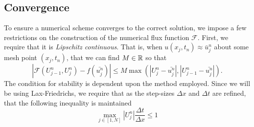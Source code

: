 \documentclass{myproject}
\begin{document}
\subsection{Convergence}
To ensure a numerical scheme converges to the correct solution, we impose a few restrictions on the construction of the numerical flux function $\mathcal{F}$. First, we require that it is \emph{Lipschitz continuous}. That is, when $u(x_j,t_n) \approx \bar{u}_j^n$ about some mesh point $(x_j,t_n)$, that we can find $M \in \operatorname{\mathbb{R}}$ so that
\begin{equation}
    \left| \mathcal{F}(U_{j-1}^n, U_j^n) - f(\bar{u_j^n}) \right| \leq M \max\left( \left| U_j^n - \bar{u^n_j} \right|, \left| U_{j-1}^n - \bar{u_j^n} \right| \right).
\end{equation}
The condition for stability is dependent upon the method employed. Since we will be using Lax-Friedrichs, we require that as the step-sizes $\Delta x$ and $\Delta t$ are refined, that the following inequality is maintained
\begin{equation}
    \max_{j \in [1, N]} |U_j^n| \frac{\Delta t}{\Delta x} \leq 1
\end{equation}
\end{document}
